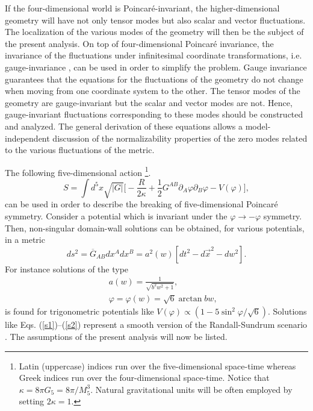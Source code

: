 \documentclass[a4paper,12pt]{article}
\begin{document}
If the four-dimensional world is Poincar\'e-invariant, the higher-dimensional 
geometry will have not only tensor modes but also scalar and  vector 
fluctuations. The localization of the 
various modes of the geometry will then be the subject of the present 
analysis. On top of four-dimensional Poincar\'e invariance, 
the invariance of the fluctuations under infinitesimal coordinate 
transformations, i.e. gauge-invariance \cite{bardeen}, can be used 
in order to simplify the problem.
Gauge invariance guarantees that the equations for the fluctuations 
of the geometry do not change when moving from one coordinate system 
to the other. The tensor modes of the geometry are gauge-invariant 
but the scalar and vector modes are not. Hence, gauge-invariant
fluctuations corresponding to these modes should be constructed and analyzed.
The general derivation of these equations allows a model-independent
 discussion of the 
normalizability properties of the zero modes related to the various
fluctuations of the metric.

The following five-dimensional action \footnote{ Latin (uppercase) indices 
run over the five-dimensional space-time whereas Greek indices run over the 
four-dimensional space-time. Notice that 
 $\kappa = 8\pi G_{5} = 8\pi/M_{5}^3$. Natural gravitational 
units will be often employed by setting $2 \kappa =1$.}. 
\begin{equation}
S= \int d^{5}x \sqrt{|G|}\biggl[- \frac{R}{2\kappa} + \frac{1}{2} G^{A B} 
\partial_{A} \varphi \partial_{B} \varphi - V(\varphi)\biggr],
\label{ac}
\end{equation}
can be used in order to describe the breaking of five-dimensional Poincar\'e 
symmetry. Consider a potential which is invariant under the 
$\varphi \rightarrow -\varphi$ symmetry. Then, non-singular domain-wall 
solutions can be obtained, for various potentials, in a metric 
\begin{equation}
ds^2 = {\overline G}_{A B} dx^A d x^B  = a^2(w) [dt^2 - d\vec{x}^2 - dw^2].
\label{m1}
\end{equation}
For instance solutions of the type 
\begin{eqnarray}
&& a(w) = \frac{1}{\sqrt{b^2 w^2 + 1}},
\label{s1}\\
&& \varphi = \varphi(w) = \sqrt{6} \arctan{b w},
\label{s2}
\end{eqnarray}
is found for trigonometric potentials \cite{gr,kt,fr} like $V(\varphi) 
\propto ( 1 - 5 \sin^2{\varphi/\sqrt{6}})$. Solutions like Eqs. 
(\ref{s1})--(\ref{s2}) represent a smooth  version of the Randall-Sundrum
scenario \cite{rusu1,rusu2}.
The assumptions of the present analysis will now be listed. 
\end{document}
